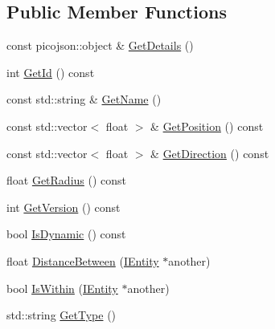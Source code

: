 \subsection*{Public Member Functions}
\begin{DoxyCompactItemize}
\item 
const picojson\+::object \& \hyperlink{classcsci3081_1_1EntityBase_aed18a7db12bfc8d6908ac6c28078110c}{Get\+Details} ()
\item 
int \hyperlink{classcsci3081_1_1EntityBase_a2802163d8d20092d985e763ad91d26da}{Get\+Id} () const
\item 
const std\+::string \& \hyperlink{classcsci3081_1_1EntityBase_ac18421e6e96eb3939e136a579c9ac6dd}{Get\+Name} ()
\item 
const std\+::vector$<$ float $>$ \& \hyperlink{classcsci3081_1_1EntityBase_a05830db8b41c0a9c05eec08f95f683ad}{Get\+Position} () const
\item 
const std\+::vector$<$ float $>$ \& \hyperlink{classcsci3081_1_1EntityBase_aeffff43e1d9b696b0ea3de83f7bee37d}{Get\+Direction} () const
\item 
float \hyperlink{classcsci3081_1_1EntityBase_abf61eb1cc8b94a7756f0ebc6a0c8a8f3}{Get\+Radius} () const
\item 
int \hyperlink{classcsci3081_1_1EntityBase_af5c87e8daf9161dc8c959c355b076bea}{Get\+Version} () const
\item 
bool \hyperlink{classcsci3081_1_1EntityBase_aa2a894f7821745acd91fbfb2e2e92082}{Is\+Dynamic} () const
\item 
float \hyperlink{classcsci3081_1_1EntityBase_a41270ec9049d9d0a379987ab95796bd9}{Distance\+Between} (\hyperlink{classentity__project_1_1IEntity}{I\+Entity} $\ast$another)
\item 
bool \hyperlink{classcsci3081_1_1EntityBase_a7ed05da61dab982c517c3481941a4be8}{Is\+Within} (\hyperlink{classentity__project_1_1IEntity}{I\+Entity} $\ast$another)
\item 
std\+::string \hyperlink{classcsci3081_1_1EntityBase_ac2efc31e2a346b29897f711c44b71ecb}{Get\+Type} ()
\end{DoxyCompactItemize}
